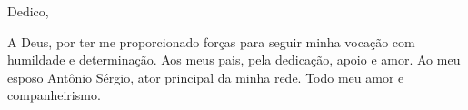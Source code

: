 Dedico,

A Deus, por ter me proporcionado forças para seguir minha vocação com humildade e determinação. Aos meus pais, pela dedicação, apoio e amor. Ao meu esposo Antônio Sérgio, ator principal da minha rede. Todo meu amor e companheirismo. 